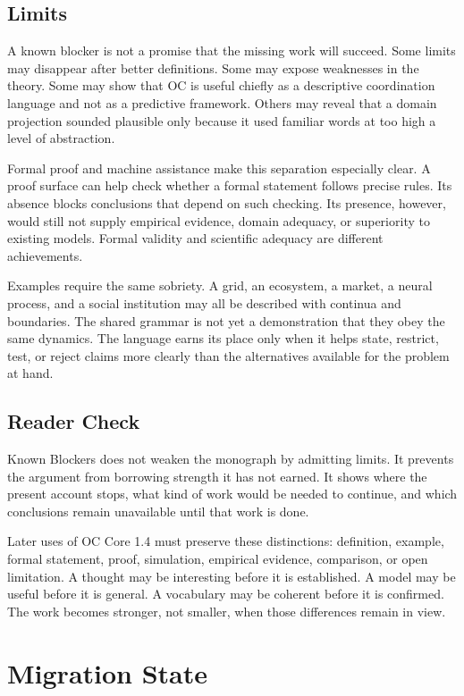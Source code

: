 \documentclass[11pt,a4paper,openany]{book}
\begin{document}
\subsection{Limits}
A known blocker is not a promise that the missing work will succeed. Some limits may disappear after better definitions. Some may expose weaknesses in the theory. Some may show that OC is useful chiefly as a descriptive coordination language and not as a predictive framework. Others may reveal that a domain projection sounded plausible only because it used familiar words at too high a level of abstraction. \cite{wilson_renormalization,landau_stat_physics}\par
Formal proof and machine assistance make this separation especially clear. A proof surface can help check whether a formal statement follows precise rules. Its absence blocks conclusions that depend on such checking. Its presence, however, would still not supply empirical evidence, domain adequacy, or superiority to existing models. Formal validity and scientific adequacy are different achievements.\par
Examples require the same sobriety. A grid, an ecosystem, a market, a neural process, and a social institution may all be described with continua and boundaries. The shared grammar is not yet a demonstration that they obey the same dynamics. The language earns its place only when it helps state, restrict, test, or reject claims more clearly than the alternatives available for the problem at hand.\par
\subsection{Reader Check}
Known Blockers does not weaken the monograph by admitting limits. It prevents the argument from borrowing strength it has not earned. It shows where the present account stops, what kind of work would be needed to continue, and which conclusions remain unavailable until that work is done. \cite{wilson_renormalization,landau_stat_physics}\par
Later uses of OC Core 1.4 must preserve these distinctions: definition, example, formal statement, proof, simulation, empirical evidence, comparison, or open limitation. A thought may be interesting before it is established. A model may be useful before it is general. A vocabulary may be coherent before it is confirmed. The work becomes stronger, not smaller, when those differences remain in view.\par
\section{Migration State}
\end{document}
